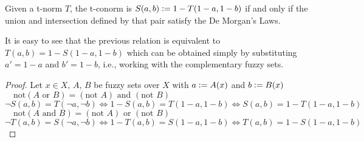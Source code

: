 \begin{proposition}
  Given a t-norm $T$, the t-conorm is $S(a,b)\mathrel{\mathop:}= 1 - T(1-a, 1-b)$ if and only if the union and intersection defined by that pair satisfy the De Morgan's Laws.
\end{proposition}
\begin{remark}
  It is easy to see that the previous relation is equivalent to $T(a,b) = 1-S(1-a, 1-b)$ which can be obtained simply by substituting $a'=1-a$ and $b'=1-b$, i.e., working with the complementary fuzzy sets.
\end{remark}

\begin{proof}
  Let $x\in X$, $A$, $B$ be fuzzy sets over $X$ with $a \mathrel{\mathop:}= A(x)$ and $b \mathrel{\mathop:}= B(x)$\\

  $\quad \boxed{\text{not}(A \text{ or } B) = (\text{not } A) \text{ and } (\text{not } B)}$\\
  [0.5em]
  $\lnot S(a,b) = T(\lnot a, \lnot b) \iff 1 - S(a,b) = T(1-a, 1-b) \iff S(a,b) = 1 - T(1-a, 1-b)$\\

  $\quad \boxed{\text{not}(A \text{ and } B) = (\text{not } A) \text{ or } (\text{not } B)}$\\
  [0.5em]
  $\lnot T(a,b) = S(\lnot a, \lnot b) \iff 1 - T(a,b) = S(1-a, 1-b) \iff T(a,b) = 1 - S(1-a, 1-b)$

\end{proof}



